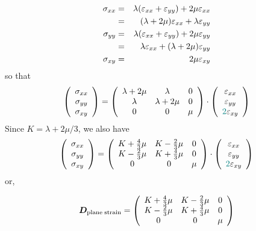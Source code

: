 \begin{eqnarray}
\sigma_{xx} 
&=& \lambda (\varepsilon_{xx}+\varepsilon_{yy}) + 2\mu \varepsilon_{xx} \nonumber\\
&=& (\lambda+2\mu)\varepsilon_{xx} +\lambda \varepsilon_{yy} \nonumber\\
\sigma_{yy}
&=& \lambda (\varepsilon_{xx}+\varepsilon_{yy}) + 2\mu \varepsilon_{yy} \nonumber\\
&=& \lambda \varepsilon_{xx} + (\lambda+2\mu)\varepsilon_{yy} \nonumber\\
\sigma_{xy} &=& 2 \mu \varepsilon_{xy} 
\end{eqnarray}
so that
\[
\left(
\begin{array}{c}
\sigma_{xx}\\
\sigma_{yy}\\
\sigma_{xy}
\end{array}
\right)
=
\left(
\begin{array}{ccc}
\lambda+2\mu & \lambda & 0 \\
\lambda & \lambda+2\mu &  0 \\
0 &0 & \mu
\end{array}
\right)
\cdot
\left(
\begin{array}{c}
\varepsilon_{xx}\\
\varepsilon_{yy}\\
{\color{teal}2}\varepsilon_{xy}
\end{array}
\right) 
\]
Since $K=\lambda+2\mu/3$, we also have
\[
\left(
\begin{array}{c}
\sigma_{xx}\\
\sigma_{yy}\\
\sigma_{xy}
\end{array}
\right)
=
\left(
\begin{array}{ccc}
K+\frac43 \mu & K-\frac23 \mu & 0 \\
K-\frac23 \mu & K+\frac43 \mu & 0 \\
0 & 0 & \mu
\end{array}
\right)
\cdot
\left(
\begin{array}{c}
\varepsilon_{xx}\\
\varepsilon_{yy}\\
{\color{teal}2}\varepsilon_{xy}
\end{array}
\right) 
\]
or,
\begin{mdframed}[backgroundcolor=blue!5]
\[
{\bm D}_{\rm plane \; strain}=
\left(
\begin{array}{ccc}
K+\frac43 \mu & K-\frac23 \mu & 0 \\
K-\frac23 \mu & K+\frac43 \mu & 0 \\
0 & 0 & \mu
\end{array}
\right)
\]
\end{mdframed}




